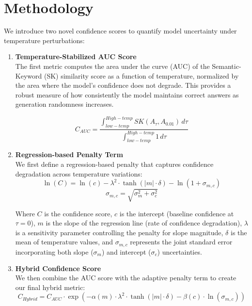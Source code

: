 \documentclass[sigconf]{acmart}
\begin{document}
\section{Methodology}

We introduce two novel confidence scores to quantify model uncertainty under temperature perturbations:
\begin{enumerate}
    \item \textbf{Temperature-Stabilized AUC Score}\\
    The first metric computes the area under the curve (AUC) of the Semantic-Keyword (SK) similarity score as a function of temperature, normalized by the area where the model's confidence does not degrade. This provides a robust measure of how consistently the model maintains correct answers as generation randomness increases.

    \begin{equation}
        C_{AUC} = \frac{\int_{low-temp}^{High-temp} SK(A_\tau, A_{0.01}) \, d\tau}{\int_{low-temp}^{High-temp} 1 \, d\tau}
    \end{equation}
    
    \item \textbf{Regression-based Penalty Term}\\
    We first define a regression-based penalty that captures confidence degradation across temperature variations:
    \begin{equation}
        \ln(C) = \ln(c) - \lambda^2 \cdot \tanh(|m| \cdot \delta) - \ln(1 + \sigma_{m,c})
    \end{equation}
    \begin{equation}
        \sigma_{m,c} = \sqrt{\sigma^2_m + \sigma^2_c}
    \end{equation}
    
    Where $C$ is the confidence score, $c$ is the intercept (baseline confidence at $\tau=0$), $m$ is the slope of the regression line (rate of confidence degradation), $\lambda$ is a sensitivity parameter controlling the penalty for slope magnitude, $\delta$ is the mean of temperature values, and $\sigma_{m,c}$ represents the joint standard error incorporating both slope ($\sigma_m$) and intercept ($\sigma_c$) uncertainties.
    
    \item \textbf{Hybrid Confidence Score}\\
    We then combine the AUC score with the adaptive penalty term to create our final hybrid metric:
    \begin{equation}
        C_{Hybrid} = C_{AUC} \cdot \exp\left(-\alpha(m) \cdot \lambda^2 \cdot \tanh(|m| \cdot \delta) - \beta(c) \cdot \ln(\sigma_{m,c})\right)
    \end{equation}
    

\end{enumerate}
\end{document}
